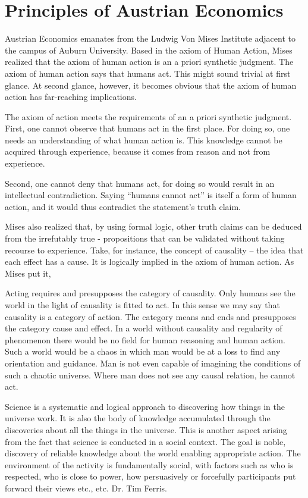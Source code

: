 \section{Principles of Austrian Economics}

Austrian Economics emanates from the Ludwig Von Mises Institute adjacent to the campus of Auburn University. Based in the axiom of Human Action, Mises realized that the axiom of human action is an a priori synthetic judgment. The axiom of human action says that humans act. This might sound trivial at first glance. At second glance, however, it becomes obvious that the axiom of human action has far-reaching implications.

The axiom of action meets the requirements of an a priori synthetic judgment. First, one cannot observe that humans act in the first place. For doing so, one needs an understanding of what human action is. This knowledge cannot be acquired through experience, because it comes from reason and not from experience.

Second, one cannot deny that humans act, for doing so would result in an intellectual contradiction. Saying ``humans cannot act'' is itself a form of human action, and it would thus contradict the statement’s truth claim.

Mises also realized that, by using formal logic, other truth claims can be deduced from the irrefutably true - propositions that can be validated without taking recourse to experience. Take, for instance, the concept of causality – the idea that each effect has a cause. It is logically implied in the axiom of human action. As Mises put it,

Acting requires and presupposes the category of causality. Only humans see the world in the light of causality is fitted to act. In this sense we may say that causality is a category of action. The category means and ends and presupposes the category cause and effect. In a world without causality and regularity of phenomenon there would be no field for human reasoning and human action. Such a world would be a chaos in which man would be at a loss to find any orientation and guidance. Man is not even capable of imagining the conditions of such a chaotic universe. Where man does not see any causal relation, he cannot act.

Science is a systematic and logical approach to discovering how things in the universe work. It is also the body of knowledge accumulated through the discoveries about all the things in the universe. This is another aspect arising from the fact that science is conducted in a social context. The goal is noble, discovery of reliable knowledge about the world enabling appropriate action. The environment of the activity is fundamentally social, with factors such as who is respected, who is close to power, how persuasively or forcefully participants put forward their views etc., etc. Dr. Tim Ferris.

